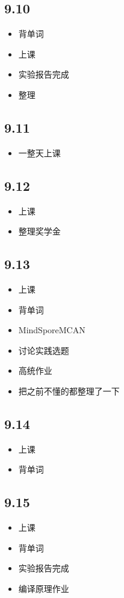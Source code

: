 \documentclass[UTF8]{ctexart}
\begin{document}
\subsection*{9.10}
\begin{itemize}
    \item 背单词
    \item 上课
    \item 实验报告完成
    \item 整理
\end{itemize}
\subsection*{9.11}
\begin{itemize}
    \item 一整天上课
\end{itemize}
\subsection*{9.12}
\begin{itemize}
    \item 上课
    \item 整理奖学金
\end{itemize}
\subsection*{9.13}
\begin{itemize}
    \item 上课
    \item 背单词
    \item MindSporeMCAN
    \item 讨论实践选题
    \item 高统作业
    \item 把之前不懂的都整理了一下
\end{itemize}
\subsection*{9.14}
\begin{itemize}
    \item 上课
    \item 背单词
\end{itemize}
\subsection*{9.15}
\begin{itemize}
    \item 上课
    \item 背单词
    \item 实验报告完成
    \item 编译原理作业
\end{itemize}
\end{document}
